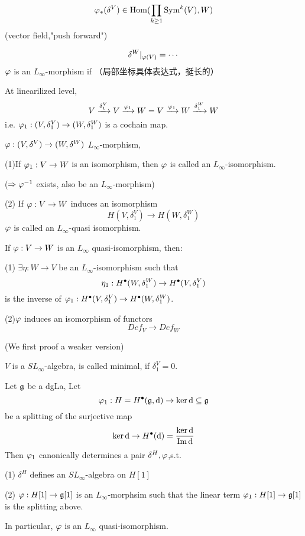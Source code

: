 
$$\varphi_*(\delta^V)\in \operatorname{Hom}(\prod_{k\geq 1}\operatorname{Sym}^k(V),W)$$
(vector field,"push forward")

$$\delta^W|_{\varphi(V)}=\cdots$$
$\varphi$ is an $L_\infty$-morphism if
（局部坐标具体表达式，挺长的）

At linearilized level,
$$
  V\xrightarrow{\delta_1^V}V\xrightarrow{\varphi_1}W= V\xrightarrow{\varphi_1}W\xrightarrow{\delta_1^W}W
$$
i.e. $\varphi_1:(V,\delta_1^V)\to (W,\delta_1^W)$ is a cochain map.

\begin{definition}
$\varphi:(V,\delta^V)\to(W,\delta^W)$ $L_\infty$-morphism,

(1)If $\varphi_1:V\to W$ is an isomorphism, then $\varphi$ is called an
$L_\infty$-isomorphism.

($\Rightarrow\varphi^{-1}$ exists, also be an $L_\infty$-morphism)

(2) If $\varphi:V\to W$ induces an isomorphism
$$H(V,\delta_1^V)\to H(W,\delta_1^W)$$
$\varphi$ is called an $L_\infty$-quasi isomorphism.
\end{definition}

\begin{thm}
If $\varphi:V\to W$ is an $L_\infty$ quasi-isomorphism, then:

(1) $\exists\eta:W\to V$ be an $L_\infty$-isomorphism such that
$$\eta_1:H^{\bullet}(W,\delta_1^W)\to H^{\bullet}(V,\delta_1^V)$$
is the inverse of $\varphi_1:H^{\bullet}(V,\delta_1^V)\to H^{\bullet}(W,\delta_1^W)$.

(2)$\varphi$ induces an isomorphism of functors
$$Def_V\to Def_W$$
\end{thm}

(We first proof a weaker version)

\begin{definition}
$V$ is a $SL_\infty$-algebra, is called minimal, if
$\delta_1^V=0$.
\end{definition}

\begin{prop}
Let $\mathfrak{g}$ be a dgLa, Let
$$\varphi_1:H=H^{\bullet}(\mathfrak{g},\mathrm{d})\to\ker\mathrm{d}\subseteq\mathfrak{g}$$
be a splitting of the surjective map
$$\ker\mathrm{d}\to H^{\bullet}(\mathrm{d})=\frac{\ker\mathrm{d}}{\operatorname{Im}\mathrm{d}}$$
Then $\varphi_1$ canonically determines a pair $\delta^H,\varphi$,s.t.

(1) $\delta^H$ defines an $SL_\infty$-algebra on $H[1]$

(2) $\varphi:H[1]\to\mathfrak{g}[1]$ is an $L_\infty$-morphsim
such that the linear term $\varphi_1:H[1]\to\mathfrak{g}[1]$ is the splitting above.

In particular, $\varphi$ is an $L_\infty$ quasi-isomorphism.
\end{prop}

